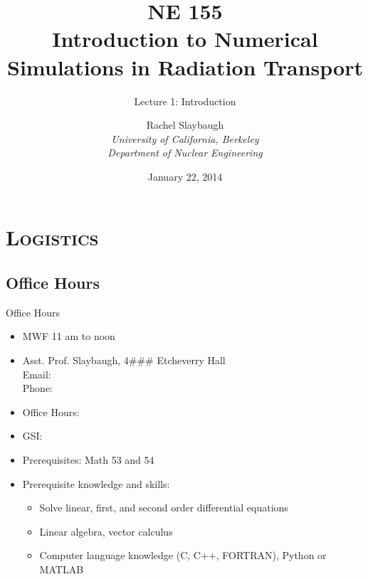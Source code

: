 \documentclass[xcolor=x11names,compress]{beamer}
\renewcommand{\(}{\begin{columns}}
\renewcommand{\)}{\end{columns}}
\newcommand{\<}[1]{\begin{column}{#1}}
\renewcommand{\>}{\end{column}}
\begin{document}
\begin{frame}
\title{NE 155\\Introduction to Numerical Simulations in Radiation Transport}
\subtitle{Lecture 1: Introduction}
\author{
        Rachel Slaybaugh\\
        \vspace*{1em}
        {\it University of California, Berkeley\\
         Department of Nuclear Engineering}\\
}
\date{
        January 22, 2014
}
\titlepage
\end{frame}

\section{\scshape Logistics}
\subsection{Office Hours}
\begin{frame}{Office Hours}
\begin{itemize}
\item MWF 11 am to noon
\item Asst. Prof. Slaybaugh, 4### Etcheverry Hall\\
      Email:\\
      Phone: 
\item Office Hours:
\item GSI: 
\item Prerequisites: Math 53 and 54
\item Prerequisite knowledge and skills: 
\begin{itemize}
\item Solve linear, first, and second order differential equations
\item Linear algebra, vector calculus
\item Computer language knowledge (C, C++, FORTRAN), Python or MATLAB	
\end{itemize}
\end{itemize}
\end{frame}

\end{document}

